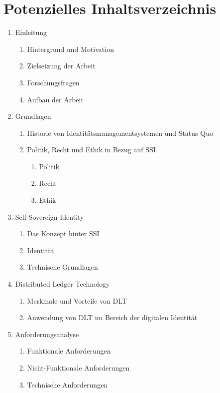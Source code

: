 \chapter{Potenzielles Inhaltsverzeichnis}

\begin{enumerate}
	\item Einleitung
	\begin{enumerate}
		\item Hintergrund und Motivation
		\item Zielsetzung der Arbeit
		\item Forschungsfragen
		\item Aufbau der Arbeit
	\end{enumerate}
	
	\item Grundlagen
	\begin{enumerate}
		\item Historie von Identitätsmanagementsystemen und Status Quo
		\item Politik, Recht und Ethik in Bezug auf SSI
		\begin{enumerate}
			\item Politik
			\item Recht
			\item Ethik
		\end{enumerate}
	\end{enumerate}
		
	\item Self-Sovereign-Identity
	\begin{enumerate}
		\item Das Konzept hinter SSI
		\item Identität
		\item Technische Grundlagen
	\end{enumerate}
	
	\item Distributed Ledger Technology
	\begin{enumerate}
		\item Merkmale und Vorteile von DLT
		\item Anwendung von DLT im Bereich der digitalen Identität
	\end{enumerate}
	
	\item Anforderungsanalyse
	\begin{enumerate}
		\item Funktionale Anforderungen
		\item Nicht-Funktionale Anforderungen
		\item Technische Anforderungen
	\end{enumerate}
	

\end{enumerate}
